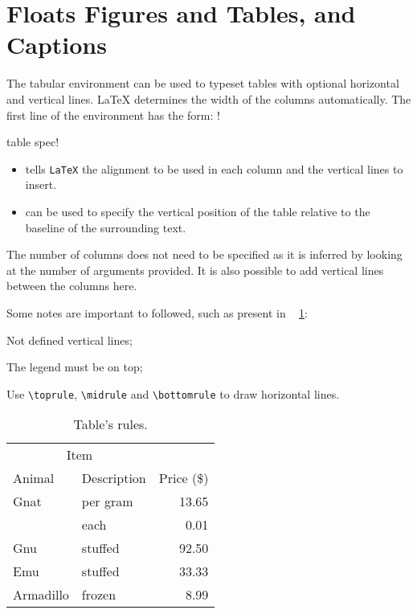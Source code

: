 
\section{Floats Figures and Tables, and Captions} %
\label{sec:floats_figures_and_captions}

The tabular environment can be used to typeset tables with optional horizontal and vertical lines. LaTeX determines the width of the columns automatically. The first line of the environment has the form: 
\spverb!\begin{tabular}[pos]{table spec}!

\begin{itemize}
\item[table spec] tells \texttt{LaTeX} the alignment to be used in each column and the vertical lines to insert.
\item[pos] can be used to specify the vertical position of the table relative to the baseline of the surrounding text. 
\end{itemize}

The number of columns does not need to be specified as it is inferred by looking at the number of arguments provided. It is also possible to add vertical lines between the columns here. 

Some notes are important to followed, such as present in \tablename~ \ref{tab:results}: 
\begin{asparaenum}[i)]
	\item Not defined vertical lines;
	\item The legend must be on top;
	\item Use \verb!\toprule!, \verb!\midrule! and \verb!\bottomrule! to draw horizontal lines.
\end{asparaenum}
 
\begin{table}[ht]
	\caption{Table's rules.}
	\label{tab:results}
\centering
\begin{tabular}{llr}
\toprule
\multicolumn{2}{c}{Item} \\
\cmidrule(r){1-2}
Animal & Description & Price (\$) 
\\
\midrule
Gnat  & per gram & 13.65 \\
      & each     &  0.01 \\
Gnu   & stuffed  & 92.50 \\
Emu   & stuffed  & 33.33 \\
Armadillo & frozen & 8.99 \\
\bottomrule
\end{tabular}
\end{table}


\end{tabular}
